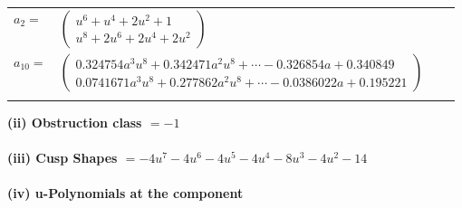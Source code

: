 \documentclass[1p]{elsarticle_modified}
\theoremstyle{definition}
\begin{document}
\begin{tabular}{m{7pt} m{180pt} m{7pt} m{180pt} }
\flushright $a_{2}=$&$\begin{pmatrix}u^6+u^4+2 u^2+1\\u^8+2 u^6+2 u^4+2 u^2\end{pmatrix}$ \\
\flushright $a_{10}=$&$\begin{pmatrix}0.324754 a^{3} u^{8}+0.342471 a^{2} u^{8}+\cdots-0.326854 a+0.340849\\0.0741671 a^{3} u^{8}+0.277862 a^{2} u^{8}+\cdots-0.0386022 a+0.195221\end{pmatrix}$\\&\end{tabular}
\flushleft \textbf{(ii) Obstruction class $= -1$}\\~\\
\flushleft \textbf{(iii) Cusp Shapes $= -4 u^7-4 u^6-4 u^5-4 u^4-8 u^3-4 u^2-14$}\\~\\
\newpage\renewcommand{\arraystretch}{1}
\flushleft \textbf{(iv) u-Polynomials at the component}\newline \\
\end{document}
